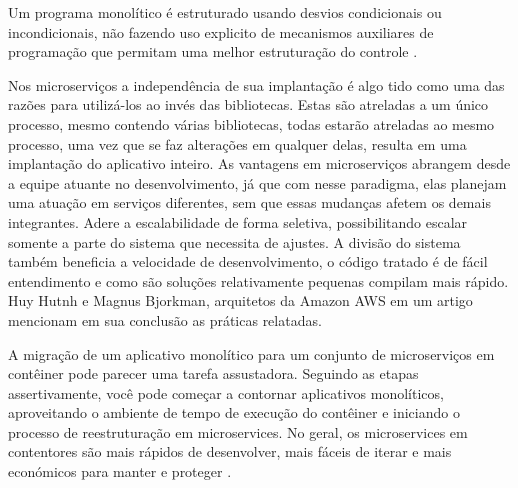 Um programa monolítico é estruturado usando desvios condicionais ou incondicionais, não fazendo uso explicito de mecanismos
auxiliares de programação que permitam uma melhor estruturação do
controle \cite{teoria-da-computação-3ed-ufrgs-maquinas-universais-e-computabilidade}.


Nos microserviços a independência de sua implantação é algo tido como uma das razões para utilizá-los ao invés das
bibliotecas. Estas são atreladas a um único processo, mesmo contendo várias bibliotecas, todas estarão atreladas ao mesmo
processo, uma vez que se faz alterações em qualquer delas, resulta em uma implantação do aplicativo inteiro.
As vantagens em microserviços abrangem desde a equipe atuante no desenvolvimento, já que com nesse paradigma, elas planejam
uma atuação em serviços diferentes, sem que essas mudanças afetem os demais integrantes. Adere a escalabilidade de forma
seletiva, possibilitando escalar somente a parte do sistema que necessita de ajustes. A divisão do sistema também beneficia
a velocidade de desenvolvimento, o código tratado é de fácil entendimento e como são soluções relativamente pequenas
compilam mais rápido. Huy Hutnh e Magnus Bjorkman, arquitetos da Amazon AWS em um artigo mencionam em sua conclusão as práticas relatadas.

\begin{citacao}
A migração de um aplicativo monolítico para um conjunto de microserviços em contêiner pode parecer uma tarefa assustadora.
Seguindo as etapas assertivamente, você pode começar a contornar aplicativos monolíticos, aproveitando o ambiente de tempo
de execução do contêiner e iniciando o processo de reestruturação em microservices. No geral, os microservices em
contentores são mais rápidos de desenvolver, mais fáceis de iterar e mais económicos para manter e
proteger \cite{deploying-java-microservices-on-amazon-ec2-container-service}.
\end{citacao}
